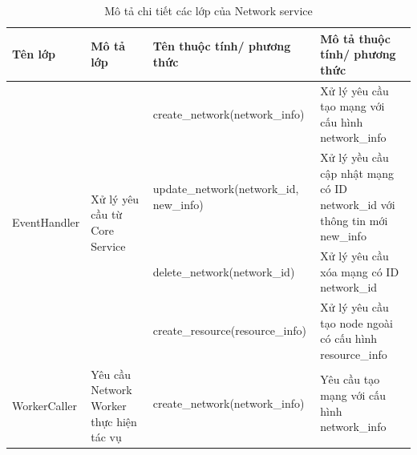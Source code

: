 \documentclass[../DoAn.tex]{subfiles}
\begin{document}
\begin{longtable}{|p{}|p{}|p{}|p{}|}
    \caption{Mô tả chi tiết các lớp của Network service}
    \label{tab:classNetworkService}                                                                                                                                                                                                                                                \\
    \hline
    Tên lớp                                                    & Mô tả lớp                                                                 & Tên thuộc tính/ phương thức                               & Mô tả thuộc tính/ phương thức                                             \\ \hline
    \endhead
    \multirow[t]{4}{0.175\textwidth}{\hspace{0pt}EventHandler} & \multirow[t]{4}{0.175\textwidth}{Xử lý yêu cầu từ Core Service}           & create\_network\hspace{0pt}(network\_info)                & Xử lý yêu cầu tạo mạng với cấu hình network\_info                         \\ \cline{3-4}
                                                               &                                                                           & update\_network\hspace{0pt}(network\_id, new\_info)       & Xử lý yều cầu cập nhật mạng có ID network\_id với thông tin mới new\_info \\ \cline{3-4}
                                                               &                                                                           & delete\_network\hspace{0pt}(network\_id)                  & Xử lý yêu cầu xóa mạng có ID network\_id                                  \\ \cline{3-4}
                                                               &                                                                           & create\_resource\hspace{0pt}(resource\_info)              & Xử lý yêu cầu tạo node ngoài có cấu hình resource\_info                   \\ \hline
    \multirow[t]{4}{0.175\textwidth}{\hspace{0pt}WorkerCaller} & \multirow[t]{4}{0.175\textwidth}{Yêu cầu Network Worker thực hiện tác vụ} & create\_network\hspace{0pt}(network\_info)                & Yêu cầu tạo mạng với cấu hình network\_info                               \\ \cline{3-4}

\end{longtable}
\end{document}
